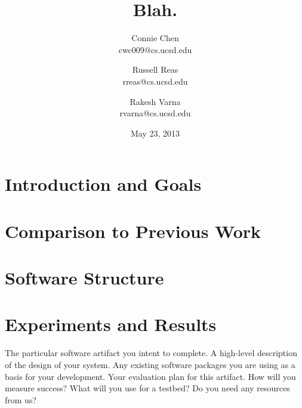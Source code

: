 \documentclass[12pt]{article}
\title{Blah.}
\author{Connie Chen \\ cwc009@cs.ucsd.edu
\and Russell Reas \\ rreas@cs.ucsd.edu
\and Rakesh Varna \\ rvarna@cs.ucsd.edu}
\date{May 23, 2013}
\begin{document}

\section{Introduction and Goals}

\section{Comparison to Previous Work}

\section{Software Structure}

\section{Experiments and Results}

The particular software artifact you intent to complete.
A high-level description of the design of your system.
Any existing software packages you are using as a basis for your development.
Your evaluation plan for this artifact. How will you measure success? What will you use for a testbed? Do you need any resources from us?
\end{document}
